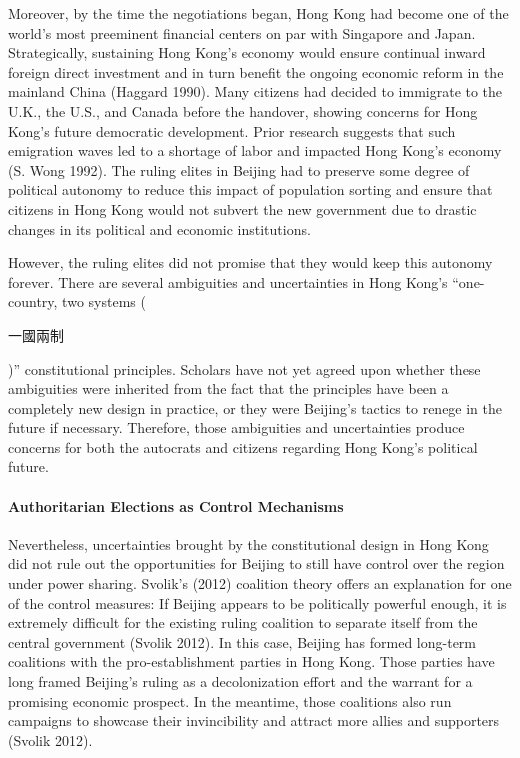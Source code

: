 \documentclass[letterpaper, 12pt]{article}
\begin{document}
Moreover, by the time the negotiations began, Hong Kong had become one of the world's most preeminent financial centers on par with Singapore and Japan. Strategically, sustaining Hong Kong's economy would ensure continual inward foreign direct investment and in turn benefit the ongoing economic reform in the mainland China (Haggard 1990). Many citizens had decided to immigrate to the U.K., the U.S., and Canada before the handover, showing concerns for Hong Kong's future democratic development. Prior research suggests that such emigration waves led to a shortage of labor and impacted Hong Kong's economy (S. Wong 1992). The ruling elites in Beijing had to preserve some degree of political autonomy to reduce this impact of population sorting and ensure that citizens in Hong Kong would not subvert the new government due to drastic changes in its political and economic institutions. 

However, the ruling elites did not promise that they would keep this autonomy forever. There are several ambiguities and uncertainties in Hong Kong's ``one-country, two systems (\begin{CJK*}{UTF8}{bkai}一國兩制\end{CJK*})'' constitutional principles. Scholars have not yet agreed upon whether these ambiguities were inherited from the fact that the principles have been a completely new design in practice, or they were Beijing's tactics to renege in the future if necessary. Therefore, those ambiguities and uncertainties produce concerns for both the autocrats and citizens regarding Hong Kong's political future.

\paragraph{Authoritarian Elections as Control Mechanisms} 
Nevertheless, uncertainties brought by the constitutional design in Hong Kong did not rule out the opportunities for Beijing to still have control over the region under power sharing. Svolik's (2012) coalition theory offers an explanation for one of the control measures: If Beijing appears to be politically powerful enough, it is extremely difficult for the existing ruling coalition to separate itself from the central government (Svolik 2012). In this case, Beijing has formed long-term coalitions with the pro-establishment parties in Hong Kong. Those parties have long framed Beijing's ruling as a decolonization effort and the warrant for a promising economic prospect. In the meantime, those coalitions also run campaigns to showcase their invincibility and attract more allies and supporters (Svolik 2012).
\end{document}
